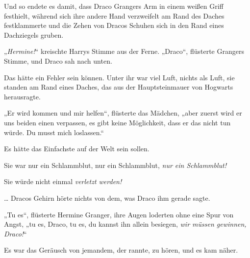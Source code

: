 Und so endete es damit, dass Draco Grangers Arm in einem weißen Griff festhielt, während sich ihre andere Hand verzweifelt am Rand des Daches festklammerte und die Zehen von Dracos Schuhen sich in den Rand eines Dachziegels gruben.

„\emph{Hermine!}“ kreischte Harrys Stimme aus der Ferne.
„Draco“, flüsterte Grangers Stimme, und Draco sah nach unten.

Das hätte ein Fehler sein können. Unter ihr war viel Luft, nichts als Luft, sie standen am Rand eines Daches, das aus der Hauptsteinmauer von Hogwarts herausragte.

„Er wird kommen und mir helfen“, flüsterte das Mädchen, „aber zuerst wird er uns beiden einen  verpassen, es gibt keine Möglichkeit, dass er das nicht tun würde. Du musst mich loslassen.“

Es hätte das Einfachste auf der Welt sein sollen.

Sie war nur ein Schlammblut, nur ein Schlammblut, \emph{nur ein Schlammblut!}

Sie würde nicht einmal \emph{verletzt werden!}

… Dracos Gehirn hörte nichts von dem, was Draco ihm gerade sagte.

„Tu es“, flüsterte Hermine Granger, ihre Augen loderten ohne eine Spur von Angst, „tu es, Draco, tu es, du kannst ihn allein besiegen, \emph{wir müssen gewinnen, Draco!}“

Es war das Geräusch von jemandem, der rannte, zu hören, und es kam näher.

